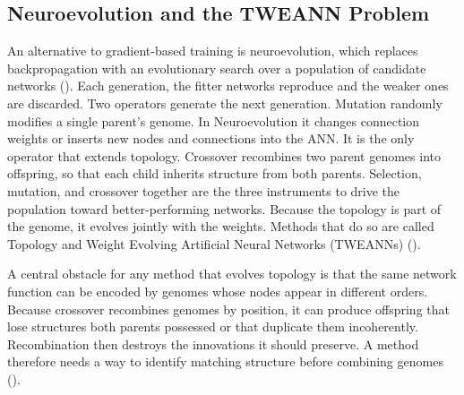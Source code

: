 \documentclass[12pt]{article}
\begin{document}
\subsection{Neuroevolution and the TWEANN Problem}
\label{subsec:neuroevolution}


An alternative to gradient-based training is neuroevolution, which replaces backpropagation with an evolutionary search over a population of candidate networks (\cite{stanley_designing_2019}).
Each generation, the fitter networks reproduce and the weaker ones are discarded.
Two operators generate the next generation.
Mutation randomly modifies a single parent's genome. In Neuroevolution it changes connection weights or inserts new nodes and connections into the ANN. It is the only operator that extends topology.
Crossover recombines two parent genomes into offspring, so that each child inherits structure from both parents.
Selection, mutation, and crossover together are the three instruments to drive the population toward better-performing networks.
Because the topology is part of the genome, it evolves jointly with the weights. Methods that do so are called Topology and Weight Evolving Artificial Neural Networks (TWEANNs) (\cite{stanley_evolving_2002}).

A central obstacle for any method that evolves topology is that the same network function can be encoded by genomes whose nodes appear in different orders.
Because crossover recombines genomes by position, it can produce offspring that lose structures both parents possessed or that duplicate them incoherently.
Recombination then destroys the innovations it should preserve.
A method therefore needs a way to identify matching structure before combining genomes (\cite{stanley_evolving_2002}).
\end{document}
